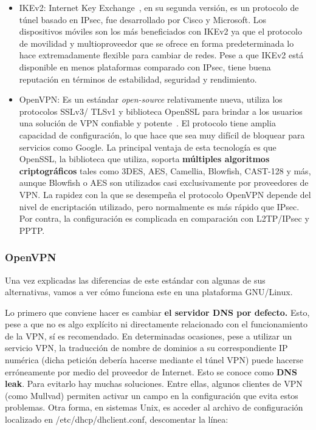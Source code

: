 \begin{itemize}
 	\item IKEv2: Internet Key Exchange~\cite{article:sstp}, en su segunda versión, es un protocolo de túnel basado en IPsec, fue desarrollado por Cisco y Microsoft.
 	Los dispositivos móviles son los más beneficiados con IKEv2 ya que el protocolo de movilidad y multioproveedor que se ofrece en forma predeterminada lo hace extremadamente flexible para cambiar de redes. Pese a que IKEv2 está disponible en menos plataformas comparado con IPsec, tiene buena reputación en términos de estabilidad, seguridad y rendimiento.
 	
 	\item OpenVPN: Es un estándar \textit{open-source }relativamente nueva, utiliza los protocolos SSLv3/ TLSv1 y biblioteca OpenSSL para brindar a los usuarios una solución de VPN confiable y potente~\cite{article:sstp}. El protocolo tiene amplia capacidad de configuración, lo que hace que sea muy difícil de bloquear para servicios como Google.	La principal ventaja de esta tecnología es que OpenSSL, la biblioteca que utiliza, soporta\textbf{ múltiples algoritmos criptográficos }tales como 3DES, AES, Camellia, Blowfish, CAST-128 y más, aunque Blowfish o AES son utilizados casi exclusivamente por proveedores de VPN.
 	La rapidez con la que se desempeña el protocolo OpenVPN depende del nivel de encriptación utilizado, pero normalmente es más rápido que IPsec. Por contra, la configuración es complicada en comparación con L2TP/IPsec y PPTP.
 \end{itemize}
 
 \subsubsection{OpenVPN}
 
	Una vez explicadas las diferencias de este estándar con algunas de sus alternativas, vamos a ver cómo funciona este en una plataforma GNU/Linux.
	
	Lo primero que conviene hacer es cambiar \textbf{el servidor DNS por defecto.}
	Esto, pese a que no es algo explícito ni directamente relacionado con el funcionamiento de la VPN, sí es recomendado. En determinadas ocasiones, pese a utilizar un servicio VPN, la traducción de nombre de dominios a su correspondiente IP numérica (dicha petición debería hacerse mediante el túnel VPN) puede hacerse erróneamente por medio del proveedor de Internet. Esto se conoce como \textbf{DNS leak}. 
	Para evitarlo hay muchas soluciones. Entre ellas, algunos clientes de VPN (como Mullvad) permiten activar un campo en la configuración que evita estos problemas. Otra forma, en sistemas Unix, es acceder al archivo de configuración localizado en /etc/dhcp/dhclient.conf, descomentar la línea:
	
